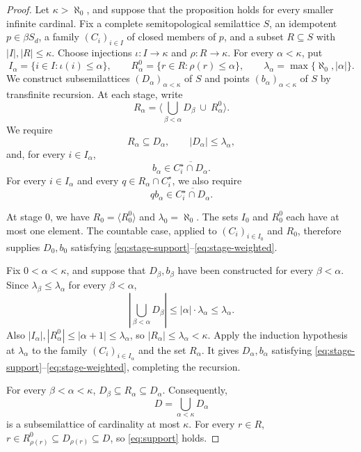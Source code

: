 \documentclass[11pt,a4paper]{article}
\theoremstyle{definition}
\theoremstyle{remark}
\numberwithin{equation}{section}
\newcommand{\gen}[1]{\langle #1\rangle}
\newcommand{\cl}[1]{\overline{#1}}
\begin{document}
\begin{proof}
Let \(\kappa>\aleph_0\), and suppose that the proposition holds for
every smaller infinite cardinal. Fix a complete semitopological
semilattice \(S\), an idempotent \(p\in\beta S_d\), a family
\((C_i)_{i\in I}\) of closed members of \(p\), and a subset
\(R\subseteq S\) with \(|I|,|R|\le\kappa\). Choose injections
\(\iota:I\to\kappa\) and \(\rho:R\to\kappa\). For every \(\alpha<\kappa\), put
\[
I_\alpha=\{i\in I:\iota(i)\le\alpha\},\qquad
R_\alpha^0=\{r\in R:\rho(r)\le\alpha\},\qquad
\lambda_\alpha=\max\{\aleph_0,|\alpha|\}.
\]
We construct subsemilattices \((D_\alpha)_{\alpha<\kappa}\) of \(S\)
and points \((b_\alpha)_{\alpha<\kappa}\) of \(S\) by transfinite
recursion. At each stage, write
\[
R_\alpha=\gen{\bigcup_{\beta<\alpha}D_\beta\ \cup\ R_\alpha^0}.
\]
We require
\begin{equation}\label{eq:stage-support}
R_\alpha\subseteq D_\alpha,\qquad |D_\alpha|\le\lambda_\alpha,
\end{equation}
and, for every \(i\in I_\alpha\),
\begin{equation}\label{eq:stage-pure}
b_\alpha\in\cl{C_i^\star\cap D_\alpha}.
\end{equation}
For every \(i\in I_\alpha\) and every \(q\in R_\alpha\cap C_i^\star\),
we also require
\begin{equation}\label{eq:stage-weighted}
q b_\alpha\in\cl{C_i^\star\cap D_\alpha}.
\end{equation}

At stage \(0\), we have \(R_0=\gen{R_0^0}\) and
\(\lambda_0=\aleph_0\). The sets \(I_0\) and \(R_0^0\) each have
at most one element. The countable case, applied to
\((C_i)_{i\in I_0}\) and \(R_0\), therefore supplies \(D_0,b_0\)
satisfying \eqref{eq:stage-support}--\eqref{eq:stage-weighted}.

Fix \(0<\alpha<\kappa\), and suppose that \(D_\beta,b_\beta\) have
been constructed for every \(\beta<\alpha\). Since
\(\lambda_\beta\le\lambda_\alpha\) for every \(\beta<\alpha\),
\[
\left|\bigcup_{\beta<\alpha}D_\beta\right|
\le |\alpha|\cdot\lambda_\alpha\le\lambda_\alpha.
\]
Also \(|I_\alpha|,|R_\alpha^0|\le|\alpha+1|\le\lambda_\alpha\),
so \(|R_\alpha|\le\lambda_\alpha<\kappa\). Apply the induction
hypothesis at \(\lambda_\alpha\) to the family
\((C_i)_{i\in I_\alpha}\) and the set \(R_\alpha\). It gives
\(D_\alpha,b_\alpha\) satisfying
\eqref{eq:stage-support}--\eqref{eq:stage-weighted}, completing the recursion.

For every \(\beta<\alpha<\kappa\),
\(D_\beta\subseteq R_\alpha\subseteq D_\alpha\). Consequently,
\[
D=\bigcup_{\alpha<\kappa}D_\alpha
\]
is a subsemilattice of cardinality at most \(\kappa\).
For every \(r\in R\),
\(r\in R_{\rho(r)}^0\subseteq D_{\rho(r)}\subseteq D\), so
\eqref{eq:support} holds.


\end{proof}
\end{document}

